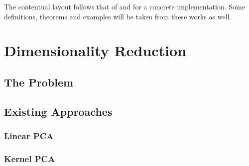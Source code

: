The contentual layout follows that of \cite{Coifman20065} and \cite{PLM_UCTHESIS_03} for a concrete implementation. Some definitions, theorems and examples will be taken from these works as well.

\section{Dimensionality Reduction}

\subsection{The Problem}
\subsection{Existing Approaches}
\subsubsection{Linear PCA}
\subsubsection{Kernel PCA}
